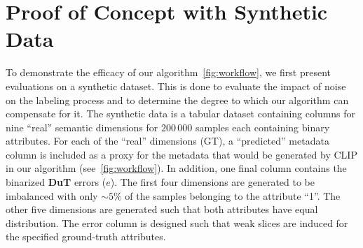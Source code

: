 \section{Proof of Concept with Synthetic Data}
\label{sec:synthetic_data}



To demonstrate the efficacy of our algorithm~\cref{fig:workflow}, we first present evaluations on a synthetic dataset. This is done to evaluate the impact of noise on the labeling process and to determine the degree to which our algorithm can compensate for it.  
The synthetic data is a tabular dataset containing columns for nine ``real'' semantic dimensions for $200\,000$ samples each containing binary attributes. For each of the ``real'' dimensions (GT), a ``predicted'' metadata column is included as a proxy for the metadata that would be generated by CLIP in our algorithm (see~\cref{fig:workflow}). In addition, one final column contains the binarized \textbf{DuT} errors ($e$). The first four dimensions are generated to be imbalanced with only $\sim5\%$ of the samples belonging to the attribute ``1''. The other five dimensions are generated such that both attributes have equal distribution. The error column is designed such that weak slices are induced for the specified ground-truth attributes.

